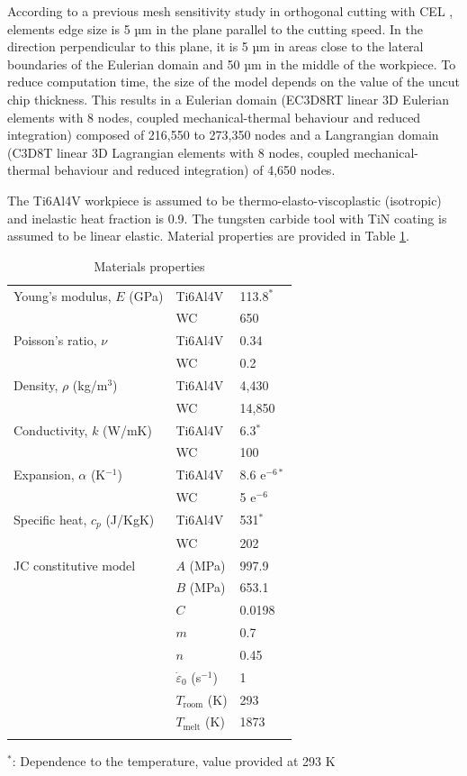 \documentclass[final,5p,times,twocolumn]{elsarticle}
\begin{document}
According to a previous mesh sensitivity study in orthogonal cutting with CEL \cite{ducobu_finite_2017}, elements edge size is 5 µm in the plane parallel to the cutting speed. In the direction perpendicular to this plane, it is 5 µm in areas close to the lateral boundaries of the Eulerian domain and 50 µm in the middle of the workpiece. To reduce computation time, the size of the model depends on the value of the uncut chip thickness. This results in a Eulerian domain (EC3D8RT linear 3D Eulerian elements with 8 nodes, coupled mechanical-thermal behaviour and reduced integration) composed of 216,550 to 273,350 nodes and a Langrangian domain (C3D8T linear 3D Lagrangian elements with 8 nodes, coupled mechanical-thermal behaviour and reduced integration) of 4,650 nodes.

The Ti6Al4V workpiece is assumed to be thermo-elasto-viscoplastic (isotropic) and inelastic heat fraction is 0.9. The tungsten carbide tool with TiN coating is assumed to be linear elastic. Material properties are provided in Table \ref{tab:prop}.

%
\begin{table}[!h]
\begin{center}
\caption{\label{tab:prop} Materials properties \cite{Seo2004, Granta, Milosevic}}
\begin{tabular}{lll}
\hline\noalign{\smallskip}
Young's modulus, $E$ (GPa) & Ti6Al4V & 113.8$^*$\\
 & WC & 650\\
Poisson's ratio, $\nu$ & Ti6Al4V & 0.34\\
 & WC & 0.2\\
Density, $\rho$ (kg/m$^3$) & Ti6Al4V & 4,430\\
 & WC & 14,850\\
Conductivity, $k$ (W/mK) & Ti6Al4V & 6.3$^*$\\
 & WC & 100\\
Expansion, $\alpha$ (K$^{-1}$) & Ti6Al4V & 8.6 e$^{-6*}$\\
 & WC & 5 e$^{-6}$\\
Specific heat, $c_{p}$ (J/KgK) & Ti6Al4V & 531$^*$\\
 & WC & 202\\
\noalign{\smallskip}\hline\noalign{\smallskip}
JC constitutive model & $A$ (MPa) & 997.9\\
 & $B$ (MPa) & 653.1\\
 & $C$ & 0.0198\\
 & $m$ & 0.7\\
 & $n$ & 0.45\\
 & $\dot{\varepsilon}_{0}$ (s$^{-1}$) & 1\\
 & $T_{\text{room}}$ (K) & 293\\
 & $T_{\text{melt}}$ (K) & 1873\\
\noalign{\smallskip}\hline\noalign{\smallskip}
\end{tabular}
\end{center}
\vspace{-0.4cm}$^*$: Dependence to the temperature, value provided at 293 K
\end{table}
%
\end{document}
